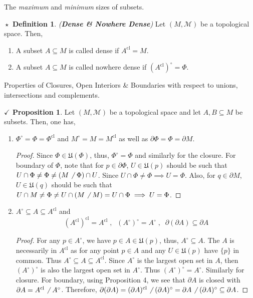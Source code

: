 \documentclass{article}
\theoremstyle{definition}
\newtheorem{definition}{$\boxed{\star}$ Definition}
\newcommand{\tit}[1]{\textit{#1}}
\theoremstyle{remark}
\theoremstyle{definition}
\theoremstyle{definition}
\newtheorem{proposition}{$\checkmark$ Proposition}
\newcommand{\topo}[1]{\mathcal{#1}}
\newcommand{\nbdsys}[2]{\mathfrak{#1}(#2)}
\newcommand{\interior}[1]{#1^\circ}
\newcommand{\boundary}[1]{\partial #1}
\newcommand{\closure}[1]{#1^{\text{cl}}}
\begin{document}
\hrulefill
The \textit{maximum } and \textit{minimum} sizes of subsets.
\hrulefill
\begin{definition}
	\tit{(\textbf{Dense \& Nowhere Dense})} Let $ (M,\topo{M}) $ be a topological space. Then,
	\begin{enumerate}
		\item{A subset $ A\subseteq M $ is called dense if $ \closure{A} = M $.}
		\item{A subset $ A\subseteq M $ is called nowhere dense if $ \interior{(\closure{A})} = \Phi $.}
	\end{enumerate}
\end{definition}
\hrulefill 
Properties of Closures, Open Interiors \& Boundaries with respect to unions, intersections and complements.
\hrulefill
\begin{proposition}
	Let $ (M,\topo{M}) $ be a topological space and let $ A,B\subseteq M $ be subsets.
	Then, one has,
	\begin{enumerate}
		\item{$ \interior{\Phi} = \Phi = \closure{\Phi} $ and $ \interior{M} = M = \closure{M} $ as well as $ \boundary{\Phi} = \Phi = \boundary{M} $.
	\begin{proof}
		Since $ \Phi \in \nbdsys{U}{\Phi}$, thus, $ \interior{\Phi} = \Phi $ and similarly for the closure. For boundary of $ \Phi $, note that for $ p \in \boundary{\Phi} $, $ U \in \nbdsys{U}{p} $ should be such that $ U \cap \Phi \neq \Phi \neq (M\not\;\;\Phi) \cap U $. Since $ U\cap \Phi \neq \Phi \implies  U= \Phi$. Also, for $ q \in \boundary{M} $, $ U\in \nbdsys{U}{q} $ should be such that $ U\cap M \neq \Phi \neq U\cap (M\not\;\;M) = U \cap \Phi  \implies U = \Phi$.
	\end{proof}	
	}
\item{$ \interior{A} \subseteq A \subseteq \closure{A} $ and
\[\closure{(\closure{A})} = \closure{A}\;,\;\; \interior{(\interior{A})} = \interior{A}\;,\;\;\boundary{(\boundary{A})} \subseteq \boundary{A}\]
\begin{proof}
	For any $ p \in \interior{A} $, we have $ p\in A\in\nbdsys{U}{p} $, thus, $ \interior{A} \subseteq A $. The $ A $ is necessarily in $ \closure{A} $ as for any point $ p\in A $ and any $ U\in \nbdsys{U}{p} $ have $ \{p\} $ in common. Thus $ \interior{A} \subseteq A \subseteq \closure{A} $. Since $ \interior{A} $ is the largest open set in $ A $, then $ \interior{(\interior{A})} $ is also the largest open set in $ \interior{A} $. Thus $ \interior{(\interior{A})} = \interior{A} $. Similarly for closure. For boundary, using Proposition 4, we see that $ \boundary{A} $ is closed with $ \boundary{A} = \closure{A}\not\;\;\interior{A} $. Therefore, $ \boundary{(\boundary{A})} =  \closure{(\boundary{A})}\not\;\;\interior{(\boundary{A})}  = \boundary{A}\not\;\;\interior{(\boundary{A})} \subseteq \boundary{A}$.

\end{proof}}
\end{enumerate}
\end{proposition}
\end{document}

